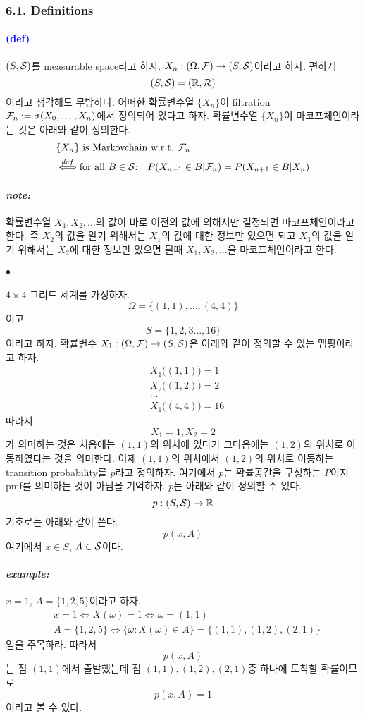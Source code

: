 \documentclass[12pt,oneside,english]{book}
\def\ck{\paragraph{\Large$\bullet$}\Large}
\def\note{\paragraph{\Large\textit{\underline{note:}}}\Large}
\def\ex{\paragraph{\Large\textit{example:}}\Large}
\newcommand{\parablue}[1]{\paragraph{\Large\textcolor{blue}{(#1)}}\Large}
\begin{document}
\subsubsection{6.1. Definitions}
\parablue{def} $(S,{\cal S})$를 measurable space라고 하자. $X_n:(\Omega,{\cal F}) \to (S,{\cal S})$이라고 하자. 편하게 
\[
(S,{\cal S})=(\mathbb{R},{\cal R})
\]
이라고 생각해도 무방하다. 어떠한 확률변수열 $\{X_n\}$이 filtration ${\cal F}_n:=\sigma(X_0,\dots,X_n)$에서 정의되어 있다고 하자. 확률변수열 $\{X_n\}$이 마코프체인이라는 것은 아래와 같이 정의한다. 
\begin{align*}
& \{X_n\} \mbox{ is Markovchain w.r.t. } {\cal F}_n \\
& \overset{def}{\Longleftrightarrow} \mbox{for all $B\in {\cal S}$:}\quad 
P(X_{n+1}\in B | {\cal F}_n)=P(X_{n+1}\in B | X_n)
\end{align*}

\note 확률변수열 $X_1,X_2,\dots$의 값이 바로 이전의 값에 의해서만 결정되면 마코프체인이라고 한다. 즉 $X_2$의 값을 알기 위해서는 $X_1$의 값에 대한 정보만 있으면 되고 $X_3$의 값을 알기 위해서는 $X_2$에 대한 정보만 있으면 될때 $X_1,X_2,\dots$을 마코프체인이라고 한다. 

\ck $4\times 4$ 그리드 세계를 가정하자. 
\[
\Omega=\{(1,1),\dots,(4,4)\}
\]
이고 
\[
S=\{1,2,3\dots,16\}
\]
이라고 하자. 확률변수 $X_1:(\Omega,{\cal F}) \to (S, {\cal S})$은 아래와 같이 정의할 수 있는 맵핑이라고 하자. 
\begin{align*}
& X_1\big((1,1)\big)=1\\ 
& X_2\big((1,2))=2\\ 
& \dots \\
& X_1\big((4,4)\big)=16
\end{align*}
따라서 
\[
X_1=1, X_2=2
\]
가 의미하는 것은 처음에는 $(1,1)$의 위치에 있다가 그다음에는 $(1,2)$의 위치로 이동하였다는 것을 의미한다. 이제 $(1,1)$의 위치에서 $(1,2)$의 위치로 이동하는 transition probability를 $p$라고 정의하자. 여기에서 $p$는 확률공간을 구성하는 $P$이지 pmf를 의미하는 것이 아님을 기억하자. $p$는 아래와 같이 정의할 수 있다. 
\[
p:(S,{\cal S}) \to \mathbb{R}
\]
기호로는 아래와 같이 쓴다. 
\[
p(x,A)
\]
여기에서 $x \in S$, $A \in {\cal S}$이다. 

\ex $x=1$, $A=\{1,2,5\}$이라고 하자. 
\begin{align*}
& x=1 \Leftrightarrow X(\omega)=1 \Leftrightarrow \omega=(1,1) \\ 
& A=\{1,2,5\} \Leftrightarrow \{\omega:X(\omega) \in A\}=\{(1,1),(1,2),(2,1)\}
\end{align*}
임을 주목하라. 따라서 
\[
p(x,A)
\] 
는 점 $(1,1)$에서 출발했는데 점 $(1,1),(1,2),(2,1)$중 하나에 도착할 확률이므로 
\[
p(x,A)=1
\]
이라고 볼 수 있다. 
\end{document}
